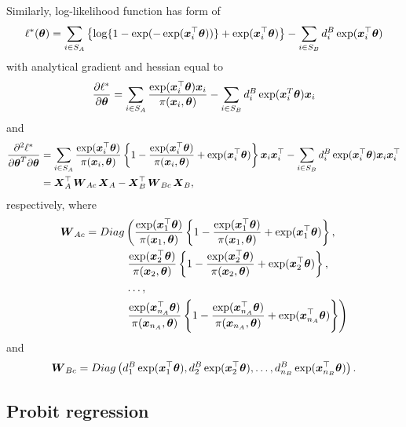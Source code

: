 \documentclass[
  letterpaper,
  DIV=11,
  numbers=noendperiod]{scrreprt}
\begin{document}
Similarly, log-likelihood function has form of \[
\ell^{*}(\boldsymbol{\theta}) = \sum_{i \in S_{A}}\left\{\log\{1 - \exp(-\exp(\boldsymbol{x}_{i}^{\top}\boldsymbol{\theta}))\} + \exp(\boldsymbol{x}_{i}^{\top}\boldsymbol{\theta})\right\} - \sum_{i \in S_{B}} d_{i}^{B}\exp(\boldsymbol{x}_{i}^{\top}\boldsymbol{\theta})
\] with analytical gradient and hessian equal to \[
    \frac{\partial \ell^*}{\partial\boldsymbol{\theta}} = \sum_{i \in S_{A}}\frac{\exp(\boldsymbol{x}_{i}^{\top}\boldsymbol{\theta})\boldsymbol{x}_{i}}{\pi(\boldsymbol{x}_{i}, \boldsymbol{\theta})} - \sum_{i \in S_{B}}d_{i}^{B}\exp(\boldsymbol{x}_{i}^{T}\boldsymbol{\theta})\boldsymbol{x}_{i}
\] and \[
\begin{align*}
    \begin{split}
    \frac{\partial^{2} \ell^{*}}{\partial\boldsymbol{\theta}^{T} \partial\boldsymbol{\theta}} & = \sum_{i \in S_A} \frac{\exp(\boldsymbol{x}_{i}^{\top}\boldsymbol{\theta})}{\pi(\boldsymbol{x}_{i}, \boldsymbol{\theta})} \left\{1 - \frac{\exp(\boldsymbol{x}_{i}^{\top}\boldsymbol{\theta})}{\pi(\boldsymbol{x}_{i}, \boldsymbol{\theta})} + \exp(\boldsymbol{x}_{i}^{\top}\boldsymbol{\theta})\right\}\boldsymbol{x}_i\boldsymbol{x}_i^{\top} - \sum_{i \in S_B}d_i^B\exp (\boldsymbol{x}_{i}^{\top}\boldsymbol{\theta})\boldsymbol{x}_i\boldsymbol{x}_i^{\top} \\ & = \boldsymbol{X}_A^{\top}\operatorname{\boldsymbol{W}}_{Ac}\boldsymbol{X}_A - \boldsymbol{X}_B^{\top}\operatorname{\boldsymbol{W}}_{Bc}\boldsymbol{X}_B,
    \end{split}
\end{align*}
\] respectively, where \[
\begin{align*}
    \operatorname{\boldsymbol{W}}_{Ac} =  Diag & \left(\frac{\exp(\boldsymbol{x}_{1}^{\top}\boldsymbol{\theta})}{\pi(\boldsymbol{x}_{1}, \boldsymbol{\theta})} \left\{1 - \frac{\exp(\boldsymbol{x}_{1}^{\top}\boldsymbol{\theta})}{\pi(\boldsymbol{x}_{1}, \boldsymbol{\theta})} + \exp(\boldsymbol{x}_{1}^{\top}\boldsymbol{\theta})\right\}, \right.
    \\
    & \left. \frac{\exp(\boldsymbol{x}_{2}^{\top}\boldsymbol{\theta})}{\pi(\boldsymbol{x}_{2}, \boldsymbol{\theta})} \left\{1 - \frac{\exp(\boldsymbol{x}_{2}^{\top}\boldsymbol{\theta})}{\pi(\boldsymbol{x}_{2}, \boldsymbol{\theta})} + \exp(\boldsymbol{x}_{2}^{\top}\boldsymbol{\theta})\right\}, \right.
    \\
    & \left. \ldots, \right.
    \\ 
    & \left. \frac{\exp(\boldsymbol{x}_{n_A}^{\top}\boldsymbol{\theta})} {\pi(\boldsymbol{x}_{n_A}, \boldsymbol{\theta})} \left\{1 - \frac{\exp(\boldsymbol{x}_{n_A}^{\top}\boldsymbol{\theta})}{\pi(\boldsymbol{x}_{n_A}, \boldsymbol{\theta})} + \exp(\boldsymbol{x}_{n_A}^{\top}\boldsymbol{\theta})\right\} \right)
\end{align*}
\] and \[
\begin{align*}
    \operatorname{\boldsymbol{W}}_{Bc} = Diag \left(d_1^B\exp (\boldsymbol{x}_{1}^{\top}\boldsymbol{\theta}), d_2^B\exp (\boldsymbol{x}_{2}^{\top}\boldsymbol{\theta}), \ldots, d_{n_B}^B\exp (\boldsymbol{x}_{n_{B}}^{\top}\boldsymbol{\theta})\right).
\end{align*}
\]

\hypertarget{probit-regression}{%
\subsection{Probit regression}\label{probit-regression}}
\end{document}
